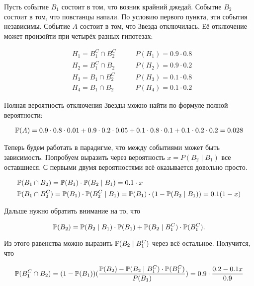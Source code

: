 \begin{sol}
Пусть событие $B_1$ состоит в том, что возник крайний джедай. Событие $B_2$ состоит в том, что повстанцы напали. По условию первого пункта, эти события независимы. Событие $A$ состоит в том, что Звезда отключилась. Её отключение может произойти при четырёх разных гипотезах: 

\begin{equation*}
\begin{aligned}
&H_1 = B_1^{C} \cap B_2^{C} \qquad &P(H_1) = 0.9 \cdot 0.8 \\
&H_2 = B_1^{C}  \cap  B_2 \qquad &P(H_2) = 0.9 \cdot 0.2 \\
&H_3 = B_1 \cap B_2^{C}\qquad &P(H_3) = 0.1 \cdot 0.8 \\ 
&H_4 = B_1 \cap B_2 \qquad &P(H_4) = 0.1 \cdot 0.2 
\end{aligned}
\end{equation*}

Полная вероятность отключения Звезды можно найти по формуле полной вероятности: 

\begin{multline*}
\mathbb{P}(A) = 0.9 \cdot 0.8 \cdot 0.01 + 0.9 \cdot 0.2 \cdot 0.05 + 0.1 \cdot 0.8 \cdot 0.1 + 0.1 \cdot 0.2 \cdot 0.2 = 0.028
\end{multline*}

Теперь будем работать в парадигме, что между событиями может быть зависимость. Попробуем выразить через вероятность $x = P(B_2 \mid B_1)$ все оставшиеся.  С первыми двумя вероятностями всё оказывается довольно просто.

\begin{equation*} 
\begin{aligned}
&\mathbb{P}(B_1 \cap B_2) = \mathbb{P}(B_1) \cdot \mathbb{P}(B_2 \mid B_1) = 0.1 \cdot x \\
&\mathbb{P}(B_1 \cap B_2^C) = \mathbb{P}(B_1) \cdot \mathbb{P}(B_2^{C} \mid B_1) = \mathbb{P}(B_1) \cdot (1 - \mathbb{P}(B_2 \mid B_1)) = 0.1 (1-x) \\
\end{aligned}
\end{equation*}

Дальше нужно обратить внимание на то, что 

\[ \mathbb{P}(B_2) = \mathbb{P}(B_2 \mid B_1) \cdot \mathbb{P}(B_1) + \mathbb{P}(B_2 \mid B_1^C) \cdot \mathbb{P}(B_1^C). \]

Из этого равенства можно выразить $\mathbb{P}(B_2 \mid B_1^C) $  через всё остальное. Получится, что 
		
\begin{multline*}
\mathbb{P}(B_1^C \cap B_2) = (1 - \mathbb{P}(B_1))(\frac{\mathbb{P}(B_2) - \mathbb{P}(B_2 \mid B_1^C) \cdot \mathbb{P}(B_1^C)}{P(B_1)} ) = 0.9 \cdot \frac{0.2 - 0.1 x}{0.9}
\end{multline*}


\end{sol}
